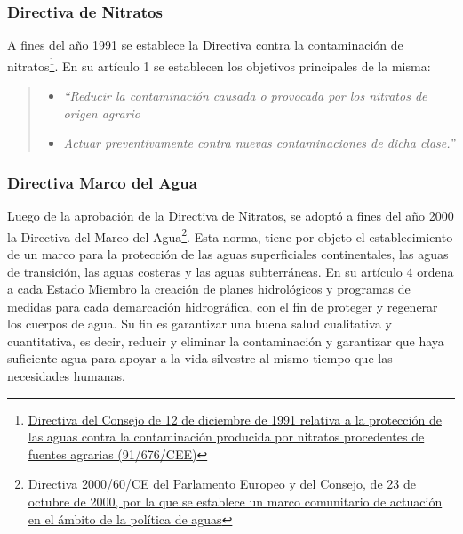 \documentclass[a4paper, nobind]{templates/ociamthesis}
\begin{document}
\hypertarget{directiva-de-nitratos}{%
\subsubsection{Directiva de Nitratos}\label{directiva-de-nitratos}}

A fines del año 1991 se establece la Directiva contra la contaminación
de nitratos\footnote{\href{https://eur-lex.europa.eu/legal-content/ES/TXT/?uri=CELEX\%3A01991L0676-20081211}{Directiva del Consejo de 12 de diciembre de 1991
  relativa a la protección de las aguas contra la contaminación
  producida por nitratos procedentes de fuentes agrarias
  (91/676/CEE)}}. En su artículo 1 se establecen los
objetivos principales de la misma:

\begin{quote}
\begin{itemize}
\item
  \emph{``Reducir la contaminación causada o provocada por los nitratos de
  origen agrario}
\item
  \emph{Actuar preventivamente contra nuevas contaminaciones de dicha
  clase.''}
\end{itemize}
\end{quote}

\hypertarget{directiva-marco-del-agua}{%
\subsubsection{Directiva Marco del Agua}\label{directiva-marco-del-agua}}

Luego de la aprobación de la Directiva de Nitratos, se adoptó a fines
del año 2000 la Directiva del Marco del Agua\footnote{\href{https://eur-lex.europa.eu/legal-content/ES/TXT/?uri=CELEX\%3A32000L0060}{Directiva 2000/60/CE del Parlamento Europeo y
  del Consejo, de 23 de octubre de 2000, por la que se establece un
  marco comunitario de actuación en el ámbito de la política de
  aguas}}. Esta
norma, tiene por objeto el establecimiento de un marco para la
protección de las aguas superficiales continentales, las aguas de
transición, las aguas costeras y las aguas subterráneas. En su artículo
4 ordena a cada Estado Miembro la creación de planes hidrológicos y
programas de medidas para cada demarcación hidrográfica, con el fin de
proteger y regenerar los cuerpos de agua. Su fin es garantizar una buena
salud cualitativa y cuantitativa, es decir, reducir y eliminar la
contaminación y garantizar que haya suficiente agua para apoyar a la
vida silvestre al mismo tiempo que las necesidades humanas.
\end{document}
